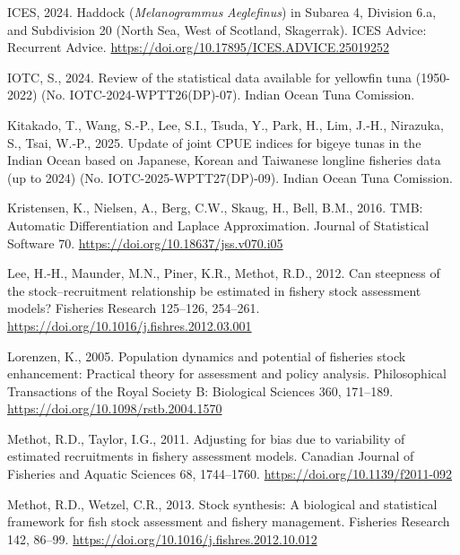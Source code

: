 \documentclass[
]{scrartcl}
\newlength{\cslhangindent}
\newenvironment{CSLReferences}[2] %
 {\begin{list}{}{%
  \setlength{\itemindent}{0pt}
  \setlength{\leftmargin}{0pt}
  \setlength{\parsep}{0pt}
  \ifodd #1
   \setlength{\leftmargin}{\cslhangindent}
   \setlength{\itemindent}{-1\cslhangindent}
  \fi
  \setlength{\itemsep}{#2\baselineskip}}}
 {\end{list}}
\begin{document}
\begin{CSLReferences}{1}{0}
ICES, 2024. Haddock ({\emph{Melanogrammus}}{ \emph{Aeglefinus}}) in
{Subarea} 4, {Division} 6.a, and {Subdivision} 20 ({North Sea}, {West}
of {Scotland}, {Skagerrak}). ICES Advice: Recurrent Advice.
\url{https://doi.org/10.17895/ICES.ADVICE.25019252}

IOTC, S., 2024. Review of the statistical data available for yellowfin
tuna (1950-2022) (No. IOTC-2024-WPTT26(DP)-07). Indian Ocean Tuna
Comission.

Kitakado, T., Wang, S.-P., Lee, S.I., Tsuda, Y., Park, H., Lim, J.-H.,
Nirazuka, S., Tsai, W.-P., 2025. Update of joint {CPUE} indices for
bigeye tunas in the {Indian Ocean} based on {Japanese}, {Korean} and
{Taiwanese} longline fisheries data (up to 2024) (No.
IOTC-2025-WPTT27(DP)-09). Indian Ocean Tuna Comission.

Kristensen, K., Nielsen, A., Berg, C.W., Skaug, H., Bell, B.M., 2016.
{TMB}: {Automatic Differentiation} and {Laplace Approximation}. Journal
of Statistical Software 70. \url{https://doi.org/10.18637/jss.v070.i05}

Lee, H.-H., Maunder, M.N., Piner, K.R., Methot, R.D., 2012. Can
steepness of the stock--recruitment relationship be estimated in fishery
stock assessment models? Fisheries Research 125--126, 254--261.
\url{https://doi.org/10.1016/j.fishres.2012.03.001}

Lorenzen, K., 2005. Population dynamics and potential of fisheries stock
enhancement: Practical theory for assessment and policy analysis.
Philosophical Transactions of the Royal Society B: Biological Sciences
360, 171--189. \url{https://doi.org/10.1098/rstb.2004.1570}

Methot, R.D., Taylor, I.G., 2011. Adjusting for bias due to variability
of estimated recruitments in fishery assessment models. Canadian Journal
of Fisheries and Aquatic Sciences 68, 1744--1760.
\url{https://doi.org/10.1139/f2011-092}

Methot, R.D., Wetzel, C.R., 2013. Stock synthesis: {A} biological and
statistical framework for fish stock assessment and fishery management.
Fisheries Research 142, 86--99.
\url{https://doi.org/10.1016/j.fishres.2012.10.012}


\end{CSLReferences}
\end{document}
